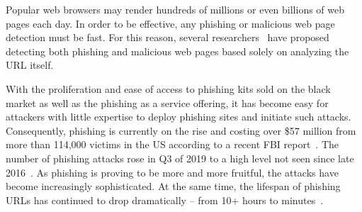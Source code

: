 Popular web browsers may render hundreds of millions or even billions of web pages each day.
In order to be effective, any phishing or malicious web page detection must be fast.
For this reason, several researchers~\citep{blum2020lexical,le2018malicious,tajaddodianfar2020texception} have proposed detecting both phishing and malicious web pages based solely on analyzing the URL itself.
\begin{comment}
	Phishing cyberattacks have been occurring for approximately 25 years, and their main goal remains the same today: convincing the user to disclose their credentials and financial information which the attacker can then use for their own financial gain. Phishing attacks can be initiated through emails and social media, and they target financial, online payments, social media, entertainment and technological companies. The attacker usually impersonates a known and reputable brand (e.g. Bank of America, Google, Amazon, Facebook, Microsoft) and attempts to convince the victim to disclose personal information.
\end{comment}
With the proliferation and ease of access to phishing kits sold on the black market as well as the phishing as a service offering, it has become easy for attackers with little expertise to deploy phishing sites and initiate such attacks. Consequently, phishing is currently on the rise and costing over \$57 million from more than 114,000 victims in the US according to a recent FBI report~\citeyearpar{fbi2019internet}.
The number of phishing attacks rose in Q3 of 2019 to a high level not seen since late 2016~\citep{helpnetsecurity2019phishing}.
As phishing is proving to be more and more fruitful, the attacks have become increasingly sophisticated. At the same time, the lifespan of phishing URLs has continued to drop dramatically – from 10+ hours to minutes~\citep{zvelophish2020phishing}. 


